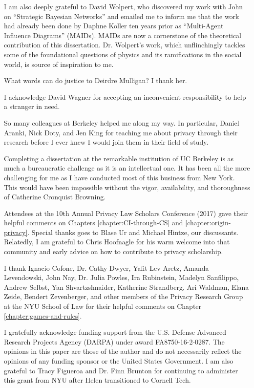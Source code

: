 \documentclass[../thesis.tex]{subfiles}
\begin{document}
 I am also deeply grateful to David Wolpert, who discovered
 my work with John on ``Strategic Bayesian Networks''
 and emailed me to inform me that the work had already
 been done by Daphne Koller ten years prior as
 ``Multi-Agent Influence Diagrams'' (MAIDs).
  MAIDs are now a cornerstone of the theoretical contribution
 of this dissertation.
 Dr. Wolpert's work, which unflinchingly tackles some
 of the foundational questions of physics and its ramifications
 in the social world, is source of inspiration to me.
 
 What words can do justice to Deirdre Mulligan?
 I thank her.

 I acknowledge David Wagner for accepting an
 inconvenient responsibility to help a stranger in need.

 So many colleagues at Berkeley helped me along my way.
 In particular, Daniel Aranki, Nick Doty, and Jen King
 for teaching me about privacy through their research
 before I ever knew I would join them in their field
 of study.

 Completing a dissertation at the remarkable institution
 of UC Berkeley is as much a bureaucratic challenge as it
 is an intellectual one.
 It has been all the more challenging for me as I
 have conducted most of this business from New York.
 This would have been impossible without the vigor,
 availability, and thoroughness of Catherine
 Cronquist Browning.
 
 Attendees at the 10th Annual Privacy Law Scholars Conference
 (2017) gave their helpful comments on
 Chapters \ref{chapter:CI-through-CS} and
 \ref{chapter:origin-privacy}.
 Special thanks goes to Blase Ur and Michael Hintze,
 our discussants.
 Relatedly, I am grateful to Chris Hoofnagle for his warm
 welcome into that community and early advice
 on how to contribute to privacy scholarship.

 I thank Ignacio Cofone, Dr. Cathy Dwyer, Yafit Lev-Aretz,
 Amanda Levendowski, John Nay, Dr. Julia Powles,
 Ira Rubinstein, Madelyn Sanfilippo, Andrew Selbst,
 Yan Shvartzshnaider,
 Katherine Strandberg, Ari Waldman, Elana Zeide,
 Bendert Zevenberger,  
 and other members of the Privacy Research Group at
 the NYU School of Law for their helpful comments
 on Chapter \ref{chapter:games-and-rules}.
 
 I gratefully acknowledge funding support 
 from the U.S. Defense Advanced Research Projects Agency (DARPA)
 under award FA8750-16-2-0287.
 The opinions in this paper are those of the author and do not
 necessarily reflect the opinions of any funding sponsor
 or the United States Government.
 I am also grateful to Tracy Figueroa and Dr. Finn Brunton
 for continuing to administer this grant from NYU after
 Helen transitioned to Cornell Tech.
 
\end{document}
